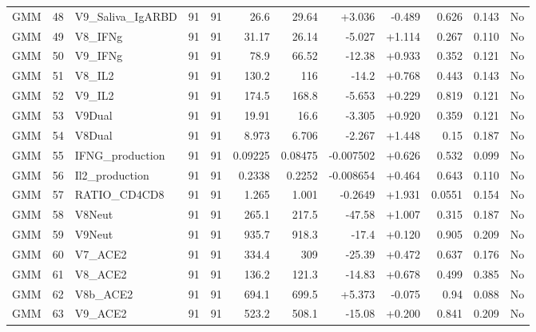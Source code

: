 \begin{landscape}
\begin{longtable}{@{}lrp{4.0cm}rrrrrrrrr@{}}
GMM & 48 & V9\_Saliva\_IgARBD & 91 & 91 & 26.6 & 29.64 & +3.036 & -0.489 & 0.626 & 0.143 & No \\
GMM & 49 & V8\_IFNg & 91 & 91 & 31.17 & 26.14 & -5.027 & +1.114 & 0.267 & 0.110 & No \\
GMM & 50 & V9\_IFNg & 91 & 91 & 78.9 & 66.52 & -12.38 & +0.933 & 0.352 & 0.121 & No \\
GMM & 51 & V8\_IL2 & 91 & 91 & 130.2 & 116 & -14.2 & +0.768 & 0.443 & 0.143 & No \\
GMM & 52 & V9\_IL2 & 91 & 91 & 174.5 & 168.8 & -5.653 & +0.229 & 0.819 & 0.121 & No \\
GMM & 53 & V9Dual & 91 & 91 & 19.91 & 16.6 & -3.305 & +0.920 & 0.359 & 0.121 & No \\
GMM & 54 & V8Dual & 91 & 91 & 8.973 & 6.706 & -2.267 & +1.448 & 0.15 & 0.187 & No \\
GMM & 55 & IFNG\_production & 91 & 91 & 0.09225 & 0.08475 & -0.007502 & +0.626 & 0.532 & 0.099 & No \\
GMM & 56 & Il2\_production & 91 & 91 & 0.2338 & 0.2252 & -0.008654 & +0.464 & 0.643 & 0.110 & No \\
GMM & 57 & RATIO\_CD4CD8 & 91 & 91 & 1.265 & 1.001 & -0.2649 & +1.931 & 0.0551 & 0.154 & No \\
GMM & 58 & V8Neut & 91 & 91 & 265.1 & 217.5 & -47.58 & +1.007 & 0.315 & 0.187 & No \\
GMM & 59 & V9Neut & 91 & 91 & 935.7 & 918.3 & -17.4 & +0.120 & 0.905 & 0.209 & No \\
GMM & 60 & V7\_ACE2 & 91 & 91 & 334.4 & 309 & -25.39 & +0.472 & 0.637 & 0.176 & No \\
GMM & 61 & V8\_ACE2 & 91 & 91 & 136.2 & 121.3 & -14.83 & +0.678 & 0.499 & 0.385 & No \\
GMM & 62 & V8b\_ACE2 & 91 & 91 & 694.1 & 699.5 & +5.373 & -0.075 & 0.94 & 0.088 & No \\
GMM & 63 & V9\_ACE2 & 91 & 91 & 523.2 & 508.1 & -15.08 & +0.200 & 0.841 & 0.209 & No \\
\end{longtable}
\endgroup
\end{landscape}

